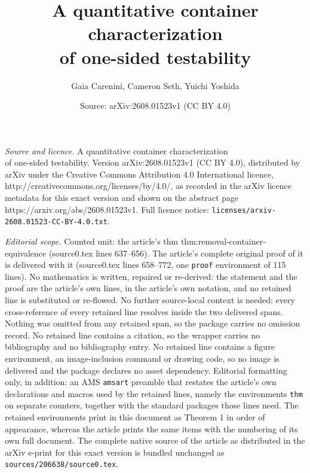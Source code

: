 \documentclass[10pt,a4paper]{amsart}
\title{A quantitative container characterization \\of one-sided testability}
\author{Gaia Carenini, Cameron Seth, Yuichi Yoshida}
\date{Source: arXiv:2608.01523v1 (CC BY 4.0)}
\begin{document}
\maketitle

\noindent\emph{Source and licence.} A quantitative container characterization \\of one-sided testability. Version arXiv:2608.01523v1 (CC BY 4.0), distributed by arXiv under the Creative Commons Attribution 4.0 International licence, http://creativecommons.org/licenses/by/4.0/, as recorded in the arXiv licence metadata for this exact version and shown on the abstract page https://arxiv.org/abs/2608.01523v1. Full licence notice: \texttt{licenses/arxiv-2608.01523-CC-BY-4.0.txt}.\par\smallskip

\noindent\textit{Editorial scope.} Counted unit: the article's thm thm:removal-container-equivalence (source0.tex lines 637--656). The article's complete original proof of it is delivered with it (source0.tex lines 658--772, one \texttt{proof} environment of 115 lines). No mathematics is written, repaired or re-derived: the statement and the proof are the article's own lines, in the article's own notation, and no retained line is substituted or re-flowed.  No further source-local context is needed: every cross-reference of every retained line resolves inside the two delivered spans.  Nothing was omitted from any retained span, so the package carries no omission record.  No retained line contains a citation, so the wrapper carries no bibliography and no bibliography entry.  No retained line contains a figure environment, an image-inclusion command or drawing code, so no image is delivered and the package declares no asset dependency.  Editorial formatting only, in addition: an AMS \texttt{amsart} preamble that restates the article's own declarations and macros used by the retained lines, namely the environments \texttt{thm} on separate counters, together with the standard packages those lines need.  The retained environments print in this document as Theorem 1 in order of appearance, whereas the article prints the same items with the numbering of its own full document.  The complete native source of the article as distributed in the arXiv e-print for this exact version is bundled unchanged as \texttt{sources/206638/source0.tex}.
\end{document}
